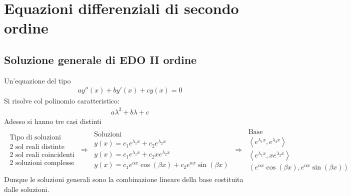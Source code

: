\documentclass[a4paper, oneside]{book}
\begin{document}
\section{Equazioni differenziali di secondo ordine}
\subsection{Soluzione generale di EDO II ordine}
Un'equazione del tipo 
\begin{gather*}
    ay''(x) + by'(x) + cy(x) = 0 
\end{gather*}
Si risolve col polinomio caratteristico:
\begin{gather*}
    a\lambda^{2} + b\lambda + c
\end{gather*}
Adesso si hanno tre casi distinti
\begin{gather*}
    \begin{array}{l}
        \text{Tipo di soluzioni} \\
        \text{2 sol reali distinte} \\
        \text{2 sol reali coincidenti} \\
        \text{2 soluzioni complesse} 
    \end{array}  \ \Longrightarrow \ 
    \begin{array}{l}
        \text{Soluzioni} \\
        y(x) = c_1 e^{\lambda_1 x} + c_2e^{\lambda_2 x} \\
        y(x) = c_1 e^{\lambda_1 x} + c_2xe^{\lambda_2 x} \\
        y(x) = c_1e^{\alpha x}\cos(\beta x) + c_2e^{\alpha x}\sin(\beta x) 
    \end{array} \ \Longrightarrow \ 
    \begin{array}{l}
        \text{Base} \\
        \left< e^{\lambda_1 x}, e^{\lambda_2x} \right> \\
        \left< e^{\lambda_1 x}, xe^{\lambda_2 x} \right> \\
        \left< e^{\alpha x}\cos(\beta x), e^{\alpha x}\sin(\beta x) \right> 
    \end{array}
\end{gather*}
Dunque le soluzioni generali sono la combinazione lineare della base 
costituita dalle soluzioni.
\end{document}
